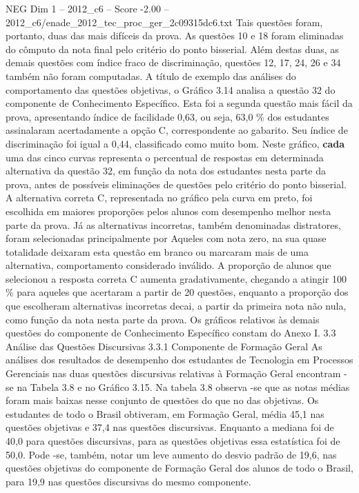 \begin{textsample}{NEG Dim 1 – 2012\_c6 – Score -2.00 – 2012\_c6/enade\_2012\_tec\_proc\_ger\_2c09315dc6.txt}
Tais questões foram, portanto, duas das mais difíceis da prova.
As questões 10 e 18 foram eliminadas do cômputo da nota final pelo critério do ponto bisserial.
Além destas duas, as demais questões com índice fraco de discriminação, questões 12, 17, 24, 26 e 34 também não foram computadas.
A título de exemplo das análises do comportamento das questões objetivas, o Gráfico 3.14 analisa a questão 32 do componente de Conhecimento Específico.
Esta foi a segunda questão mais fácil da prova, apresentando índice de facilidade 0,63, ou seja, 63,0 \% dos estudantes assinalaram acertadamente a opção C, correspondente ao gabarito.
Seu índice de discriminação foi igual a 0,44, classificado como muito bom.
Neste gráfico, \textbf{cada} uma das cinco curvas representa o percentual de respostas em determinada alternativa da questão 32, em função da nota dos estudantes nesta parte da prova, antes de possíveis eliminações de questões pelo critério do ponto bisserial.
A alternativa correta C, representada no gráfico pela curva em preto, foi escolhida em maiores proporções pelos alunos com desempenho melhor nesta parte da prova.
Já as alternativas incorretas, também denominadas distratores, foram selecionadas principalmente por Aqueles com nota zero, na sua quase totalidade deixaram esta questão em branco ou marcaram mais de uma alternativa, comportamento considerado inválido.
A proporção de alunos que selecionou a resposta correta C aumenta gradativamente, chegando a atingir 100 \% para aqueles que acertaram a partir de 20 questões, enquanto a proporção dos que escolheram alternativas incorretas decai, a partir da primeira nota não nula, como função da nota nesta parte da prova.
Os gráficos relativos às demais questões do componente de Conhecimento Específico constam do Anexo I. 3.3 Análise das Questões Discursivas 3.3.1 Componente de Formação Geral As análises dos resultados de desempenho dos estudantes de Tecnologia em Processos Gerenciais nas duas questões discursivas relativas à Formação Geral encontram -se na Tabela 3.8 e no Gráfico 3.15.
Na tabela 3.8 observa -se que as notas médias foram mais baixas nesse conjunto de questões do que no das objetivas.
Os estudantes de todo o Brasil obtiveram, em Formação Geral, média 45,1 nas questões objetivas e 37,4 nas questões discursivas.
Enquanto a mediana foi de 40,0 para questões discursivas, para as questões objetivas essa estatística foi de 50,0.
Pode -se, também, notar um leve aumento do desvio padrão de 19,6, nas questões objetivas do componente de Formação Geral dos alunos de todo o Brasil, para 19,9 nas questões discursivas do mesmo componente.

\end{textsample}
